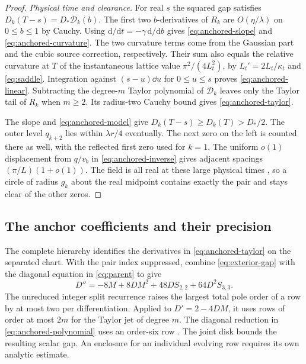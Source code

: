 \begin{proof}
\emph{Physical time and clearance.}
For real \(s\) the squared gap satisfies \(D_k(T-s)=D_*\mathcal D_k(b)\).
The first two \(b\)-derivatives of \(R_k\) are \(O(\eta/\lambda)\) on
\(0\le b\le1\) by Cauchy. Using \(\mathrm d/\mathrm dt=-\gamma\,\mathrm d/\mathrm db\)
gives \eqref{eq:anchored-slope} and \eqref{eq:anchored-curvature}.
The two curvature terms come from the Gaussian part and the cubic source
correction, respectively. Their sum also equals the relative curvature
at \(T\) of the instantaneous lattice value \(\pi^2/(4L_t^2)\), by
\(L_t'=2L_t/\kappa_t\) and \eqref{eq:saddle}. Integration against \((s-u)\dd u\) for
\(0\le u\le s\) proves \eqref{eq:anchored-linear}. Subtracting the degree-\(m\)
Taylor polynomial of \(\mathcal D_k\) leaves only the Taylor tail of \(R_k\)
when \(m\ge2\). Its radius-two Cauchy bound gives \eqref{eq:anchored-taylor}.

The slope and \eqref{eq:anchored-model} give \(D_k(T-s)\ge D_k(T)>D_*/2\).
The outer level \(q_{k+2}\) lies within \(\lambda r/4\) eventually.
The next zero on the left is counted there as well, with the reflected
first zero used for \(k=1\). The uniform \(o(1)\) displacement from \(q/v_b\)
in \eqref{eq:anchored-inverse} gives adjacent spacings
\((\pi/L)(1+o(1))\). The field is all real at these large physical times
\cite{Polymath2019}, so a circle of radius \(g_k\) about the real midpoint
contains exactly the pair and stays clear of the other zeros.
\end{proof}

\subsection{The anchor coefficients and their precision}
The complete hierarchy identifies the derivatives in
\eqref{eq:anchored-taylor} on the separated chart. With the pair index
suppressed, combine \eqref{eq:exterior-gap} with the diagonal equation
in \eqref{eq:parent} to give
\begin{equation}\label{eq:anchored-polynomial}
 D''=-8M+8DM^2+48D S_{2,2}+64D^2 S_{3,3} .
\end{equation}
The unreduced integer split recurrence raises the largest total pole
order of a row by at most two per differentiation. Applied to \(D'=2-4DM\),
it uses rows of order at most \(2m\) for the Taylor jet of degree \(m\).
The diagonal reduction in \eqref{eq:anchored-polynomial} uses an order-six
row \cite[\S3]{AGC}. The joint disk bounds the resulting scalar gap. An
enclosure for an individual evolving row requires its own analytic estimate.

